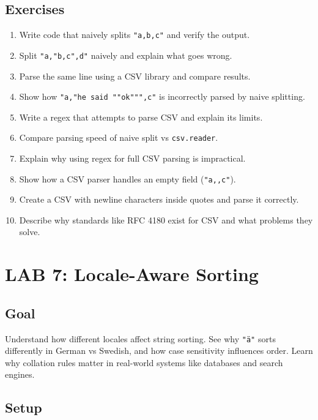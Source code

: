 \documentclass[
  letterpaper,
  DIV=11,
  numbers=noendperiod]{scrreprt}
\providecommand{\tightlist}{%
  \setlength{\itemsep}{0pt}\setlength{\parskip}{0pt}}
\begin{document}
\subsection{Exercises}\label{exercises-49}

\begin{enumerate}
\def\labelenumi{\arabic{enumi}.}
\tightlist
\item
  Write code that naively splits \texttt{"a,b,c"} and verify the output.
\item
  Split \texttt{"a,"b,c",d"} naively and explain what goes wrong.
\item
  Parse the same line using a CSV library and compare results.
\item
  Show how \texttt{"a,"he\ said\ ""ok""",c"} is incorrectly parsed by
  naive splitting.
\item
  Write a regex that attempts to parse CSV and explain its limits.
\item
  Compare parsing speed of naive split vs \texttt{csv.reader}.
\item
  Explain why using regex for full CSV parsing is impractical.
\item
  Show how a CSV parser handles an empty field (\texttt{"a,,c"}).
\item
  Create a CSV with newline characters inside quotes and parse it
  correctly.
\item
  Describe why standards like RFC 4180 exist for CSV and what problems
  they solve.
\end{enumerate}

\section{LAB 7: Locale-Aware Sorting}\label{lab-7-locale-aware-sorting}

\subsection{Goal}\label{goal-6}

Understand how different locales affect string sorting. See why
\texttt{"ä"} sorts differently in German vs Swedish, and how case
sensitivity influences order. Learn why collation rules matter in
real-world systems like databases and search engines.

\subsection{Setup}\label{setup-6}
\end{document}
